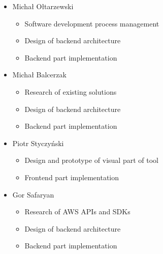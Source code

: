 \documentclass[licencjacka,en]{thesisclass}
\begin{document}
    \begin{itemize}
        \item Michał Ołtarzewski
        \begin{itemize}
            \item Software development process management
            \item Design of backend architecture
            \item Backend part implementation
        \end{itemize}
        \item Michał Balcerzak
        \begin{itemize}
            \item Research of existing solutions
            \item Design of backend architecture
            \item Backend part implementation
        \end{itemize}
        \item Piotr Styczyński
        \begin{itemize}
            \item Design and prototype of visual part of tool
            \item Frontend part implementation
        \end{itemize}
        \item Gor Safaryan
        \begin{itemize}
            \item Research of AWS APIs and SDKs
            \item Design of backend architecture
            \item Backend part implementation
        \end{itemize}
    \end{itemize}
\end{document}
